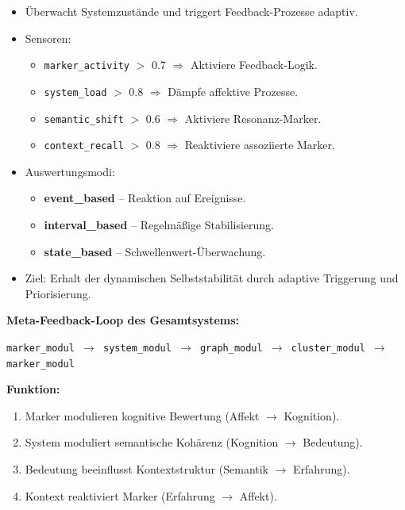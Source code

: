 \begin{itemize}
    \item Überwacht Systemzustände und triggert Feedback-Prozesse adaptiv.
    \item Sensoren:
    \begin{itemize}
        \item \texttt{marker\_activity} $>$ 0.7 $\Rightarrow$ Aktiviere Feedback-Logik.
        \item \texttt{system\_load} $>$ 0.8 $\Rightarrow$ Dämpfe affektive Prozesse.
        \item \texttt{semantic\_shift} $>$ 0.6 $\Rightarrow$ Aktiviere Resonanz-Marker.
        \item \texttt{context\_recall} $>$ 0.8 $\Rightarrow$ Reaktiviere assoziierte Marker.
    \end{itemize}
    \item Auswertungsmodi:
    \begin{itemize}
        \item \textbf{event\_based} – Reaktion auf Ereignisse.
        \item \textbf{interval\_based} – Regelmäßige Stabilisierung.
        \item \textbf{state\_based} – Schwellenwert-Überwachung.
    \end{itemize}
    \item Ziel: Erhalt der dynamischen Selbststabilität durch adaptive Triggerung und Priorisierung.
\end{itemize}

\vspace{1em}
\textbf{Meta-Feedback-Loop des Gesamtsystems:}
\begin{center}
    \texttt{marker\_modul $\rightarrow$ system\_modul $\rightarrow$ graph\_modul $\rightarrow$ cluster\_modul $\rightarrow$ marker\_modul}
\end{center}

\textbf{Funktion:}
\begin{enumerate}
    \item Marker modulieren kognitive Bewertung (Affekt $\rightarrow$ Kognition).
    \item System moduliert semantische Kohärenz (Kognition $\rightarrow$ Bedeutung).
    \item Bedeutung beeinflusst Kontextstruktur (Semantik $\rightarrow$ Erfahrung).
    \item Kontext reaktiviert Marker (Erfahrung $\rightarrow$ Affekt).
\end{enumerate}

